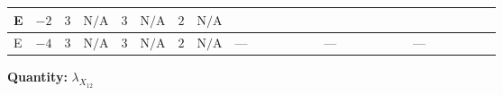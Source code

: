\documentclass[8pt]{article}
\begin{document}
\begin{landscape}
\begin{longtable}{@{}llcccccc >{\raggedright\arraybackslash}p{0.21\linewidth} >{\raggedright\arraybackslash}p{0.21\linewidth} >{\raggedright\arraybackslash}p{0.21\linewidth}@{}}
E & $-2$ & $3$ & $\text{N/A}$ & $3$ & $\text{N/A}$ & $2$ & $\text{N/A}$ & \scriptsize\adjustbox{max width=\linewidth}{$\begin{gathered} {\lambda_{X_{12}}} (6 \operatorname{Tr}\!\left({Y_d}\,\left({Y_d}\right)^{\dagger}\right)+2 \operatorname{Tr}\!\left({Y_e}\,\left({Y_e}\right)^{\dagger}\right)+6 \operatorname{Tr}\!\left({Y_u}\,\left({Y_u}\right)^{\dagger}\right))\end{gathered}$} & \scriptsize\adjustbox{max width=\linewidth}{$\begin{gathered} +4 {\lambda_{X_{7}}^{(1)}} \left({\lambda_5}\right)^{*} \\ -2 {\lambda_{X_{7}}^{(2)}} \left({\lambda_5}\right)^{*}\end{gathered}$} & \scriptsize\adjustbox{max width=\linewidth}{$\begin{gathered} +8 {\lambda_{X_{16}}} \left({\lambda_5}\right)^{*}\end{gathered}$} \\
\midrule
E & $-4$ & $3$ & $\text{N/A}$ & $3$ & $\text{N/A}$ & $2$ & $\text{N/A}$ & --- & --- & --- \\
\midrule
\bottomrule
\end{longtable}
\clearpage
\noindent\textbf{Quantity: }${\lambda_{X_{12}}}$\par\smallskip

\end{landscape}
\end{document}
